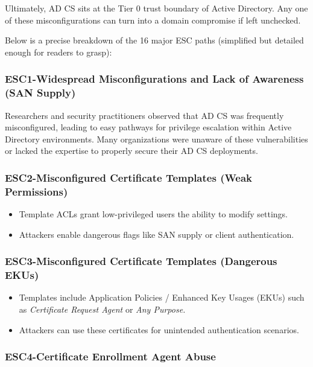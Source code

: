 {Ultimately, AD CS sits at the Tier 0 trust boundary of Active Directory. Any one of these misconfigurations can turn into a domain compromise if left unchecked.

Below is a precise breakdown of the 16 major ESC paths (simplified but detailed enough for readers to grasp):

\subsubsection{ESC1-Widespread Misconfigurations and Lack of Awareness (SAN Supply)}
Researchers and security practitioners observed that AD CS was frequently misconfigured, leading to easy pathways for privilege escalation within Active Directory environments. Many organizations were unaware of these vulnerabilities or lacked the expertise to properly secure their AD CS deployments.

\subsubsection{ESC2-Misconfigured Certificate Templates (Weak Permissions)}
\begin{itemize}
    \item Template ACLs grant low-privileged users the ability to modify settings.
    \item Attackers enable dangerous flags like SAN supply or client authentication.
\end{itemize}

\subsubsection{ESC3-Misconfigured Certificate Templates (Dangerous EKUs)}
\begin{itemize}
    \item Templates include Application Policies / Enhanced Key Usages (EKUs) such as \textit{Certificate Request Agent} or \textit{Any Purpose.}
    \item Attackers can use these certificates for unintended authentication scenarios.
\end{itemize}


\subsubsection{ESC4-Certificate Enrollment Agent Abuse}
}
